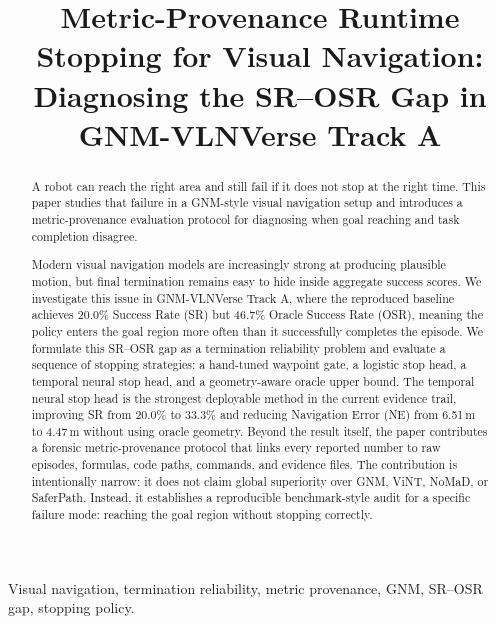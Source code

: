 \documentclass[conference]{IEEEtran}
\begin{document}
\title{Metric-Provenance Runtime Stopping for Visual Navigation: Diagnosing the SR--OSR Gap in GNM-VLNVerse Track A}

\author{
}

\maketitle

\begin{abstract}
A robot can reach the right area and still fail if it does not stop at the right time. This paper studies that failure in a GNM-style visual navigation setup and introduces a metric-provenance evaluation protocol for diagnosing when goal reaching and task completion disagree.

Modern visual navigation models are increasingly strong at producing plausible motion, but final termination remains easy to hide inside aggregate success scores. We investigate this issue in GNM-VLNVerse Track A, where the reproduced baseline achieves 20.0\% Success Rate (SR) but 46.7\% Oracle Success Rate (OSR), meaning the policy enters the goal region more often than it successfully completes the episode. We formulate this SR--OSR gap as a termination reliability problem and evaluate a sequence of stopping strategies: a hand-tuned waypoint gate, a logistic stop head, a temporal neural stop head, and a geometry-aware oracle upper bound. The temporal neural stop head is the strongest deployable method in the current evidence trail, improving SR from 20.0\% to 33.3\% and reducing Navigation Error (NE) from 6.51\,m to 4.47\,m without using oracle geometry. Beyond the result itself, the paper contributes a forensic metric-provenance protocol that links every reported number to raw episodes, formulas, code paths, commands, and evidence files. The contribution is intentionally narrow: it does not claim global superiority over GNM, ViNT, NoMaD, or SaferPath. Instead, it establishes a reproducible benchmark-style audit for a specific failure mode: reaching the goal region without stopping correctly.
\end{abstract}

\begin{IEEEkeywords}
Visual navigation, termination reliability, metric provenance, GNM, SR--OSR gap, stopping policy.
\end{IEEEkeywords}
\end{document}
